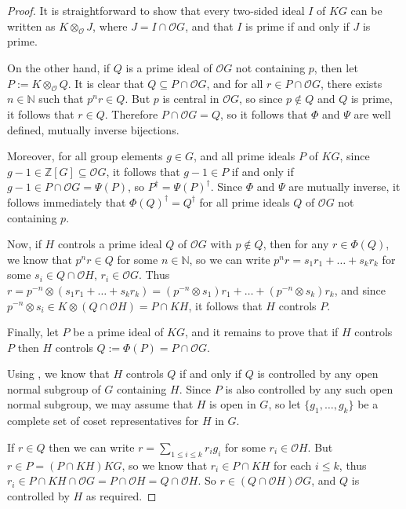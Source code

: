 \documentclass[12pt,a4paper]{article}
\theoremstyle{definition}
\theoremstyle{remark}
\theoremstyle{custthm}
\renewcommand{\O}{\mathcal{O}}
\begin{document}
\begin{proof}

It is straightforward to show that every two-sided ideal $I$ of $KG$ can be written as $K\otimes_\O J$, where $J=I\cap \O G$, and that $I$ is prime if and only if $J$ is prime.

On the other hand, if $Q$ is a prime ideal of $\O G$ not containing $p$, then let $P:=K\otimes_\O Q$. It is clear that $Q\subseteq P\cap \O G$, and for all $r\in P\cap \O G$, there exists $n\in\mathbb{N}$ such that $p^n r\in Q$. But $p$ is central in $\O G$, so since $p\notin Q$ and $Q$ is prime, it follows that $r\in Q$. Therefore $P\cap\O G=Q$, so it follows that $\Phi$ and $\Psi$ are well defined, mutually inverse bijections.

Moreover, for all group elements $g\in G$, and all prime ideals $P$ of $KG$, since $g-1\in\mathbb{Z}[G]\subseteq\O G$, it follows that $g-1\in P$ if and only if $g-1\in P\cap\O G=\Psi(P)$, so $P^\dagger=\Psi(P)^\dagger$. Since $\Phi$ and $\Psi$ are mutually inverse, it follows immediately that $\Phi(Q)^\dagger=Q^\dagger$ for all prime ideals $Q$ of $\O G$ not containing $p$.

Now, if $H$ controls a prime ideal $Q$ of $\O G$ with $p\notin Q$, then for any $r\in\Phi(Q)$, we know that $p^nr\in Q$ for some $n\in\mathbb{N}$, so we can write $p^nr=s_1r_1+\dots+s_kr_k$ for some $s_i\in Q\cap\O H$, $r_i\in\O G$. Thus $r=p^{-n}\otimes (s_1r_1+\dots+s_kr_k)=(p^{-n}\otimes s_1)r_1+\dots+(p^{-n}\otimes s_k)r_k$, and since $p^{-n}\otimes s_i\in K\otimes (Q\cap\O H)=P\cap KH$, it follows that $H$ controls $P$.

Finally, let $P$ be a prime ideal of $KG$, and it remains to prove that if $H$ controls $P$ then $H$ controls $Q:=\Phi(P)=P\cap\O G$.

Using \cite[Theorem A]{controller}, we know that $H$ controls $Q$ if and only if $Q$ is controlled by any open normal subgroup of $G$ containing $H$. Since $P$ is also controlled by any such open normal subgroup, we may assume that $H$ is open in $G$, so let $\{g_1,\dots,g_k\}$ be a complete set of coset representatives for $H$ in $G$.

If $r\in Q$ then we can write $r=\underset{1\leq i\leq k}{\sum}r_ig_i$ for some $r_i\in\O H$. But $r\in P=(P\cap KH)KG$, so we know that $r_i\in P\cap KH$ for each $i\leq k$, thus $r_i\in P\cap KH\cap \O G=P\cap \O H=Q\cap\O H$. So $r\in (Q\cap \O H)\O G$, and $Q$ is controlled by $H$ as required.\end{proof}
\end{document}
